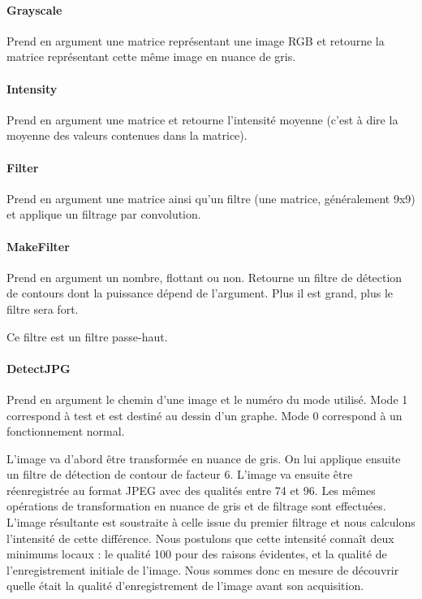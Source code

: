 \documentclass[a4paper,12pt]{article}
\begin{document}
\paragraph{Grayscale}
Prend en argument une matrice représentant une image RGB et retourne la matrice représentant cette même image en nuance de gris.

\paragraph{Intensity}
Prend en argument une matrice et retourne l'intensité moyenne (c'est à dire la moyenne des valeurs contenues dans la matrice).

\paragraph{Filter}
Prend en argument une matrice ainsi qu'un filtre (une matrice, généralement 9x9) et applique un filtrage par convolution.

\paragraph{MakeFilter}
Prend en argument un nombre, flottant ou non. Retourne un filtre de détection de contours dont la puissance dépend de l'argument. Plus il est grand, plus le filtre sera fort. 

Ce filtre est un filtre passe-haut.

\paragraph{DetectJPG}
Prend en argument le chemin d'une image et le numéro du mode utilisé. Mode 1 correspond à test et est destiné au dessin d'un graphe. Mode 0 correspond à un fonctionnement normal. 

L'image va d'abord être transformée en nuance de gris. On lui applique ensuite un filtre de détection de contour de facteur 6. L'image va ensuite être réenregistrée au format JPEG avec des qualités entre 74 et 96. Les mêmes opérations de transformation en nuance de gris et de filtrage sont effectuées. L'image résultante est soustraite à celle issue du premier filtrage et nous calculons l'intensité de cette différence. Nous postulons que cette intensité connaît deux minimums locaux : le qualité 100 pour des raisons évidentes, et la qualité de l'enregistrement initiale de l'image. Nous sommes donc en mesure de découvrir quelle était la qualité d'enregistrement de l'image avant son acquisition. 
\end{document}
